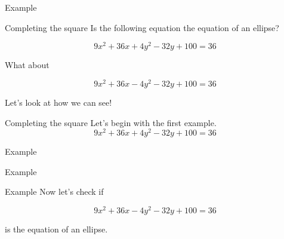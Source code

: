 \documentclass[presentation]{beamer}
\begin{document}
\begin{frame}[label={sec:org69b25a8}]{Example}
\end{frame}

\begin{frame}[label={sec:org44a3b6d}]{Completing the square}
Is the following equation the equation of an ellipse?

\[
9x^2+36x+4y^2-32y + 100 = 36\]

What about

\[
9x^2+36x-4y^2-32y + 100 = 36\]

Let's look at how we can see!
\end{frame}

\begin{frame}[label={sec:orgbaa6279}]{Completing the square}
Let's begin with the first example.
\[
9x^2+36x+4y^2-32y + 100 = 36\]

\vspace{10in}
\end{frame}

\begin{frame}[label={sec:orgc9071a1}]{Example}
\end{frame}

\begin{frame}[label={sec:org14032d2}]{Example}
\end{frame}

\begin{frame}[label={sec:orgc29bf7c}]{Example}
Now let's check if

\[
9x^2+36x-4y^2-32y + 100 = 36\]

is the equation of an ellipse.

\vspace{10in}
\end{frame}
\end{document}
